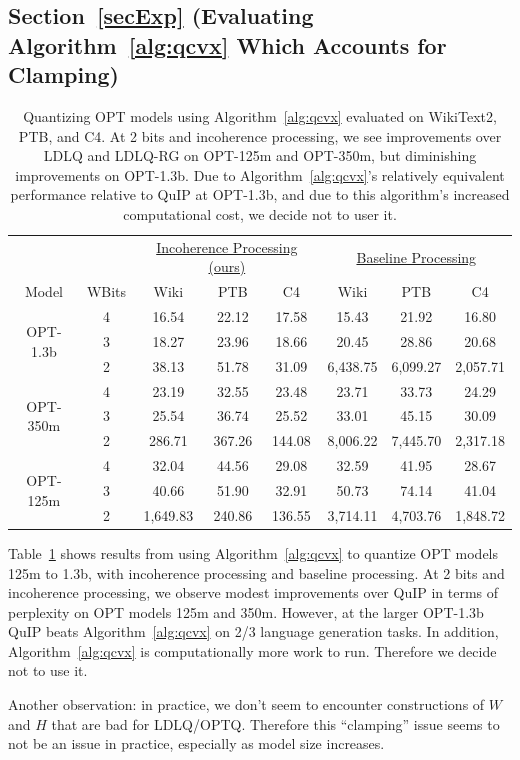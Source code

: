 \subsection{Section~\ref{secExp} (Evaluating Algorithm~\ref{alg:qcvx} Which Accounts for Clamping)}
\begin{table}[h!]
\centering
\begin{tabular}{cc|ccc|ccc}
& & 
\multicolumn{3}{c}{\underline{Incoherence Processing (ours)}}\Bstrut &
\multicolumn{3}{c}{\underline{Baseline Processing}} \\
Model & WBits\Tstrut\Bstrut & Wiki & PTB & C4 & Wiki & PTB & C4 \\
\hline
\multirow{3}{*}{OPT-1.3b}
& 4\Tstrut &
16.54 & 22.12 & 17.58 &
15.43 & 21.92 & 16.80 \\
& 3 &
18.27 & 23.96 & 18.66 &
20.45 & 28.86 & 20.68 \\
& 2\Bstrut &
38.13 & 51.78 & 31.09 &
6,438.75 & 6,099.27 & 2,057.71 \\
\hline
\multirow{3}{*}{OPT-350m}
& 4\Tstrut &
23.19 & 32.55 & 23.48 &
23.71 & 33.73 & 24.29 \\
& 3 &
25.54 & 36.74 & 25.52 &
33.01 & 45.15 & 30.09 \\
& 2\Bstrut &
286.71 & 367.26 & 144.08 &
8,006.22 & 7,445.70 & 2,317.18 \\
\hline
\multirow{3}{*}{OPT-125m}
& 4\Tstrut &
32.04 & 44.56 & 29.08 &
32.59 & 41.95 & 28.67 \\
& 3 &
40.66 & 51.90 & 32.91 &
50.73 & 74.14 & 41.04 \\
& 2\Bstrut &
1,649.83 & 240.86 & 136.55 &
3,714.11 & 4,703.76 & 1,848.72 \\
\end{tabular}
\caption{
Quantizing OPT models using Algorithm~\ref{alg:qcvx} evaluated on WikiText2, PTB, and C4.
At 2 bits and incoherence processing, we see improvements over LDLQ and LDLQ-RG on OPT-125m and OPT-350m, but diminishing improvements on OPT-1.3b.
Due to Algorithm~\ref{alg:qcvx}'s relatively equivalent performance relative to QuIP at OPT-1.3b, and due to this algorithm's increased computational cost, we decide not to user it.
}
\label{tabSuppADMM}
\end{table}

Table~\ref{tabSuppADMM} shows results from using Algorithm~\ref{alg:qcvx} to quantize OPT models 125m to 1.3b, with incoherence processing and baseline processing.
At 2 bits and incoherence processing, we observe modest improvements over QuIP in terms of perplexity on OPT models 125m and 350m.
However, at the larger OPT-1.3b QuIP beats Algorithm~\ref{alg:qcvx} on 2/3 language generation tasks.
In addition, Algorithm~\ref{alg:qcvx} is computationally more work to run.
Therefore we decide not to use it.

Another observation: in practice, we don't seem to encounter constructions of $W$ and $H$ that are bad for LDLQ/OPTQ. 
Therefore this ``clamping'' issue seems to not be an issue in practice, especially as model size increases.
